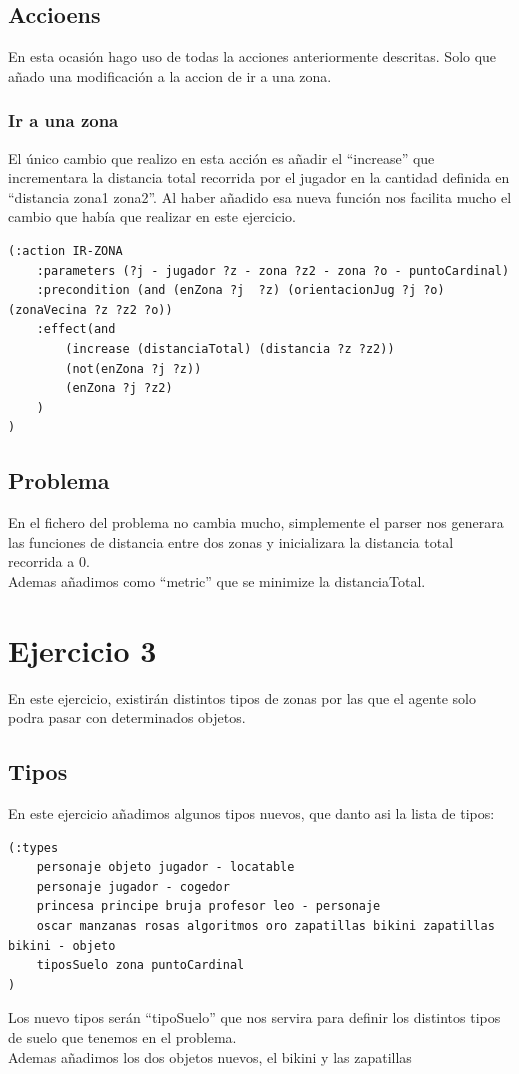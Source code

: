 \documentclass[12pt,a4paper]{article}
\begin{document}
\subsection{Accioens}
En esta ocasión hago uso de todas la acciones anteriormente descritas. Solo que añado una modificación a la accion de ir a una zona.
\subsubsection{Ir a una zona}
El único cambio que realizo en esta acción es añadir el ``increase'' que incrementara la distancia total recorrida por el jugador en la cantidad definida en ``distancia zona1 zona2''. Al haber añadido esa nueva función nos facilita mucho el cambio que había que realizar en este ejercicio. 
\begin{lstlisting}
(:action IR-ZONA
	:parameters (?j - jugador ?z - zona ?z2 - zona ?o - puntoCardinal)
	:precondition (and (enZona ?j  ?z) (orientacionJug ?j ?o)(zonaVecina ?z ?z2 ?o))
	:effect(and
		(increase (distanciaTotal) (distancia ?z ?z2))
		(not(enZona ?j ?z))
		(enZona ?j ?z2)
	)
)
\end{lstlisting}
\subsection{Problema}
En el fichero del problema no cambia mucho, simplemente el parser nos generara las funciones de distancia entre dos zonas y  inicializara la distancia total recorrida a 0.\\
Ademas añadimos como ``metric'' que se minimize la distanciaTotal. 

\section{Ejercicio 3}
En este ejercicio, existirán distintos tipos de zonas por las que el agente solo podra pasar con determinados objetos.
\subsection{Tipos}
En este ejercicio añadimos algunos tipos nuevos, que danto asi la lista de tipos:
\begin{lstlisting}
(:types  
	personaje objeto jugador - locatable
	personaje jugador - cogedor
	princesa principe bruja profesor leo - personaje
	oscar manzanas rosas algoritmos oro zapatillas bikini zapatillas bikini - objeto
	tiposSuelo zona puntoCardinal
)
\end{lstlisting}
Los nuevo tipos serán ``tipoSuelo'' que nos servira para definir los distintos tipos de suelo que tenemos en el problema.\\
Ademas añadimos los dos objetos nuevos, el bikini y las zapatillas
\end{document}
